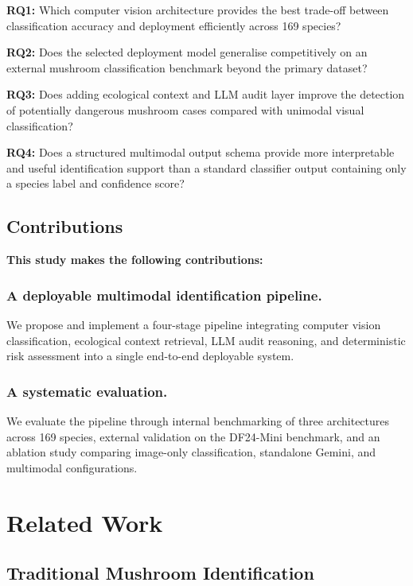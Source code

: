 \documentclass[journal,transmag]{IEEEtran}
\begin{document}
\textbf{{RQ1:}} Which computer vision architecture provides the best trade-off between classification accuracy and deployment efficiently across 169 species?

\textbf{{RQ2:}} Does the selected deployment model generalise competitively on an external mushroom classification benchmark beyond the primary dataset?

\textbf{{RQ3:}} Does adding ecological context and LLM audit layer improve the detection of potentially dangerous mushroom cases compared with unimodal visual classification?

\textbf{{RQ4:}} Does a structured multimodal output schema provide more  interpretable and useful identification support than a standard classifier output containing only a species label and confidence score?

\subsection{\textbf{Contributions}}
\textbf{This study makes the following contributions: }


\subsubsection{A deployable multimodal identification pipeline.} We propose and implement a four-stage pipeline integrating computer vision classification, ecological context retrieval, LLM audit reasoning, and deterministic risk assessment into a single end-to-end deployable system.  

\subsubsection{A systematic evaluation.} We evaluate the pipeline through internal benchmarking of three architectures across 169 species, external validation on the DF24-Mini benchmark, and an ablation study comparing image-only classification, standalone Gemini, and multimodal configurations.



\section{\textbf{Related Work}}
\subsection{Traditional Mushroom Identification}
\end{document}
